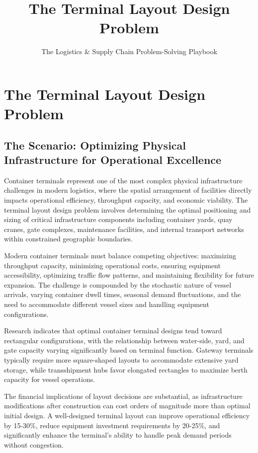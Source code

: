 \documentclass{article}
\title{The Terminal Layout Design Problem}
\author{The Logistics \& Supply Chain Problem-Solving Playbook}
\date{}
\begin{document}
\maketitle

\section{The Terminal Layout Design Problem}

\subsection{The Scenario: Optimizing Physical Infrastructure for Operational Excellence}

Container terminals represent one of the most complex physical infrastructure challenges in modern logistics, where the spatial arrangement of facilities directly impacts operational efficiency, throughput capacity, and economic viability. The terminal layout design problem involves determining the optimal positioning and sizing of critical infrastructure components including container yards, quay cranes, gate complexes, maintenance facilities, and internal transport networks within constrained geographic boundaries.

Modern container terminals must balance competing objectives: maximizing throughput capacity, minimizing operational costs, ensuring equipment accessibility, optimizing traffic flow patterns, and maintaining flexibility for future expansion. The challenge is compounded by the stochastic nature of vessel arrivals, varying container dwell times, seasonal demand fluctuations, and the need to accommodate different vessel sizes and handling equipment configurations.

Research indicates that optimal container terminal designs tend toward rectangular configurations, with the relationship between water-side, yard, and gate capacity varying significantly based on terminal function. Gateway terminals typically require more square-shaped layouts to accommodate extensive yard storage, while transshipment hubs favor elongated rectangles to maximize berth capacity for vessel operations.

The financial implications of layout decisions are substantial, as infrastructure modifications after construction can cost orders of magnitude more than optimal initial design. A well-designed terminal layout can improve operational efficiency by 15-30\%, reduce equipment investment requirements by 20-25\%, and significantly enhance the terminal's ability to handle peak demand periods without congestion.
\end{document}
